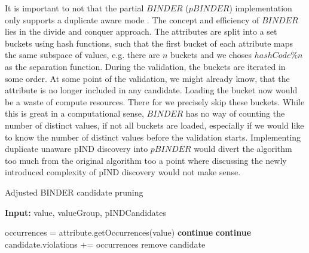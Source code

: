 It is important to not that the partial $BINDER$ ($pBINDER$) implementation only supports a duplicate aware mode %
. The concept and efficiency of $BINDER$ lies in the divide and conquer approach. The attributes are split into a set buckets using hash functions, such that the first bucket of each attribute maps the same subspace of values, e.g. there are $n$ buckets and we choses $hashCode \% n$ as the separation function. During the validation, the buckets are iterated in some order. At some point of the validation, we might already know, that the attribute is no longer included in any candidate. Loading the bucket now would be a waste of compute resources. There for we precisely skip these buckets. While this is great in a computational sense, $BINDER$ has no way of counting the number of distinct values, if not all buckets are loaded, especially if we would like to know the number of distinct values before the validation starts. Implementing duplicate unaware pIND discovery into $pBINDER$ would divert the algorithm too much from the original algorithm too a point where discussing the newly introduced complexity of pIND discovery would not make sense.



\begin{algorithm}
    \caption{Adjusted BINDER candidate pruning}\label{alg:BINDER_prune}
    \hspace*{\algorithmicindent} \textbf{Input:} value, valueGroup, pINDCandidates
    \begin{algorithmic}[1]
        \State occurrences = attribute.getOccurrences(value)
                \State \textbf{continue}
            \EndIf
                \State \textbf{continue}
            \EndIf
            \State candidate.violations += occurrences
                \State remove candidate
            \EndIf
        \EndFor
    \EndFor
    \end{algorithmic}
\end{algorithm}




